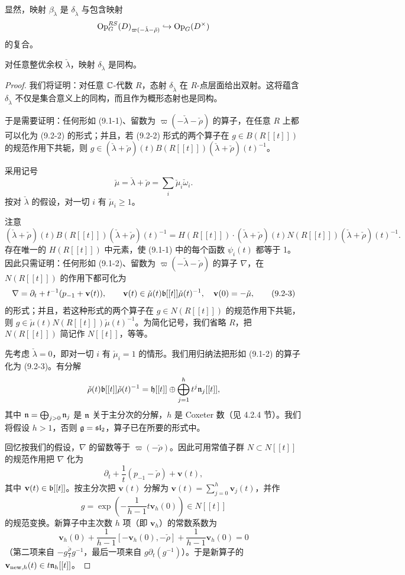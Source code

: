 显然，映射 $\beta_{\check\lambda}$ 是 $\delta_{\check\lambda}$ 与包含映射
\[
\operatorname{Op}^{RS}_G(D)_{\varpi(-\check\lambda-\check\rho)}\hookrightarrow\operatorname{Op}_G(D^\times)
\]
的复合。

\begin{proposition}
对任意整优余权 $\check\lambda$，映射 $\delta_{\check\lambda}$ 是同构。
\end{proposition}

\begin{proof}
我们将证明：对任意 $\mathbb{C}$-代数 $R$，态射 $\delta_{\check\lambda}$ 在 $R$-点层面给出双射。这将蕴含 $\delta_{\check\lambda}$ 不仅是集合意义上的同构，而且作为概形态射也是同构。

于是需要证明：任何形如 (9.1-1)、留数为 $\varpi(-\check\lambda-\check\rho)$ 的算子，在任意 $R$ 上都可以化为 (9.2-2) 的形式；并且，若 (9.2-2) 形式的两个算子在 $g\in B(R[[t]])$ 的规范作用下共轭，则 $g\in(\check\lambda+\check\rho)(t)B(R[[t]])(\check\lambda+\check\rho)(t)^{-1}$。

采用记号
\[
\check\mu = \check\lambda+\check\rho = \sum_i\check\mu_i\check\omega_i.
\]
按对 $\check\lambda$ 的假设，对一切 $i$ 有 $\check\mu_i\ge 1$。

注意
\[
(\check\lambda+\check\rho)(t)B(R[[t]])(\check\lambda+\check\rho)(t)^{-1}
= H(R[[t]])\cdot(\check\lambda+\check\rho)(t)N(R[[t]])(\check\lambda+\check\rho)(t)^{-1}.
\]
存在唯一的 $H(R[[t]])$ 中元素，使 (9.1-1) 中的每个函数 $\psi_i(t)$ 都等于 1。因此只需证明：任何形如 (9.1-2)、留数为 $\varpi(-\check\lambda-\check\rho)$ 的算子 $\nabla$，在 $N(R[[t]])$ 的作用下都可化为
\begin{equation}
\nabla = \partial_t + t^{-1}(p_{-1}+\mathbf{v}(t)),\qquad
\mathbf{v}(t)\in\check\mu(t)\mathfrak{b}[[t]]\check\mu(t)^{-1},\quad \mathbf{v}(0)=-\check\mu,
\tag{9.2-3}
\end{equation}
的形式；并且，若这种形式的两个算子在 $g\in N(R[[t]])$ 的规范作用下共轭，则 $g\in\check\mu(t)N(R[[t]])\check\mu(t)^{-1}$。为简化记号，我们省略 $R$，把 $N(R[[t]])$ 简记作 $N[[t]]$，等等。

先考虑 $\check\lambda=0$，即对一切 $i$ 有 $\check\mu_i=1$ 的情形。我们用归纳法把形如 (9.1-2) 的算子化为 (9.2-3)。有分解
\[
\check\rho(t)\mathfrak{b}[[t]]\check\rho(t)^{-1} = \mathfrak{h}[[t]]\oplus\bigoplus_{j=1}^{h}t^j\mathfrak{n}_j[[t]],
\]
其中 $\mathfrak{n} = \bigoplus_{j>0}\mathfrak{n}_j$ 是 $\mathfrak{n}$ 关于主分次的分解，$h$ 是 Coxeter 数（见 4.2.4 节）。我们将假设 $h>1$，否则 $\mathfrak{g}=\mathfrak{sl}_2$，算子已在所要的形式中。

回忆按我们的假设，$\nabla$ 的留数等于 $\varpi(-\check\rho)$。因此可用常值子群 $N\subset N[[t]]$ 的规范作用把 $\nabla$ 化为
\begin{equation}
\partial_t + \frac{1}{t}(p_{-1}-\check\rho) + \mathbf{v}(t),
\tag{9.2-4}
\end{equation}
其中 $\mathbf{v}(t)\in\mathfrak{b}[[t]]$。按主分次把 $\mathbf{v}(t)$ 分解为 $\mathbf{v}(t)=\sum_{j=0}^{h}\mathbf{v}_j(t)$，并作
\[
g = \exp\left(-\frac{1}{h-1}t\mathbf{v}_h(0)\right)\in N[[t]]
\]
的规范变换。新算子中主次数 $h$ 项（即 $\mathbf{v}_h$）的常数系数为
\[
\mathbf{v}_h(0) + \frac{1}{h-1}[-\mathbf{v}_h(0),-\check\rho] + \frac{1}{h-1}\mathbf{v}_h(0) = 0
\]
（第二项来自 $-g\frac{\check\rho}{t}g^{-1}$，最后一项来自 $g\partial_t(g^{-1})$）。于是新算子的 $\mathbf{v}_{\mathrm{new},h}(t)\in t\mathfrak{n}_h[[t]]$。


\end{proof}
